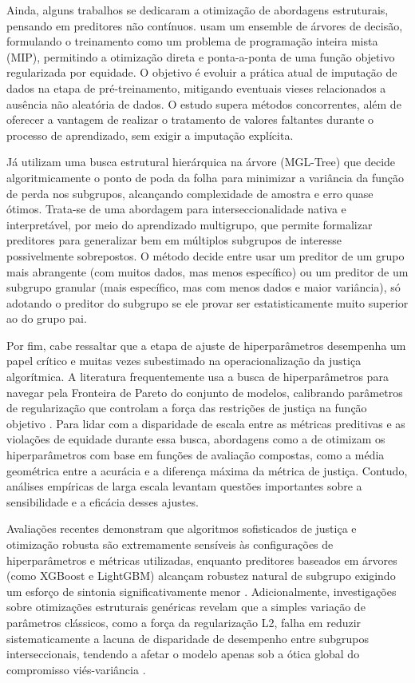 Ainda, alguns trabalhos se dedicaram a otimização de abordagens estruturais, pensando em preditores não contínuos. \citet{jeong2022fairness} usam um ensemble de árvores de decisão, formulando o treinamento como um problema de programação inteira mista (MIP), permitindo a otimização direta e ponta-a-ponta de uma função objetivo regularizada por equidade. O objetivo é evoluir a prática atual de imputação de dados na etapa de pré-treinamento, mitigando eventuais vieses relacionados a ausência não aleatória de dados. O estudo supera métodos concorrentes, além de oferecer a vantagem de realizar o tratamento de valores faltantes durante o processo de aprendizado, sem exigir a imputação explícita.

Já \citet{deng2024multi} utilizam uma busca estrutural hierárquica na árvore (MGL-Tree) que decide algoritmicamente o ponto de poda da folha para minimizar a variância da função de perda nos subgrupos, alcançando complexidade de amostra e erro quase ótimos. Trata-se de uma abordagem para interseccionalidade nativa e interpretável, por meio do aprendizado multigrupo, que permite formalizar preditores para generalizar bem em múltiplos subgrupos de interesse possivelmente sobrepostos. O método decide entre usar um preditor de um grupo mais abrangente (com muitos dados, mas menos específico) ou um preditor de um subgrupo granular (mais específico, mas com menos dados e maior variância), só adotando o preditor do subgrupo se ele provar ser estatisticamente muito superior ao do grupo pai.

Por fim, cabe ressaltar que a etapa de ajuste de hiperparâmetros desempenha um papel crítico e muitas vezes subestimado na operacionalização da justiça algorítmica. A literatura frequentemente usa a busca de hiperparâmetros para navegar pela Fronteira de Pareto do conjunto de modelos, calibrando parâmetros de regularização que controlam a força das restrições de justiça na função objetivo \cite{dinh2024learning, yazdani2024fair, zhou2023fair}. Para lidar com a disparidade de escala entre as métricas preditivas e as violações de equidade durante essa busca, abordagens como a de \citet{wang2022towards} otimizam os hiperparâmetros com base em funções de avaliação compostas, como a média geométrica entre a acurácia e a diferença máxima da métrica de justiça. Contudo, análises empíricas de larga escala levantam questões importantes sobre a sensibilidade e a eficácia desses ajustes.

Avaliações recentes demonstram que algoritmos sofisticados de justiça e otimização robusta são extremamente sensíveis às configurações de hiperparâmetros e métricas utilizadas, enquanto preditores baseados em árvores (como XGBoost e LightGBM) alcançam robustez natural de subgrupo exigindo um esforço de sintonia significativamente menor \cite{gardner2022subgroup}. Adicionalmente, investigações sobre otimizações estruturais genéricas revelam que a simples variação de parâmetros clássicos, como a força da regularização L2, falha em reduzir sistematicamente a lacuna de disparidade de desempenho entre subgrupos interseccionais, tendendo a afetar o modelo apenas sob a ótica global do compromisso viés-variância \cite{gardner2023cross}.

